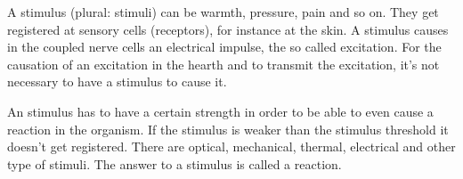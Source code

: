 \documentclass[../main.tex]{subfiles}
\begin{document}
A stimulus (plural: stimuli) can be warmth, pressure, pain and so on.
They get registered at sensory cells (receptors), for instance at the skin. A stimulus causes in the coupled nerve cells an electrical impulse, the so called excitation.
For the causation of an excitation in the hearth and to transmit the excitation, it's not necessary to have a stimulus to cause it.

An stimulus has to have a certain strength in order to be able to even cause a reaction in the organism. If the stimulus is weaker than the stimulus threshold it doesn't get registered. There are optical, mechanical, thermal, electrical and other type of stimuli. The answer to a stimulus is called a reaction. 
\end{document}

